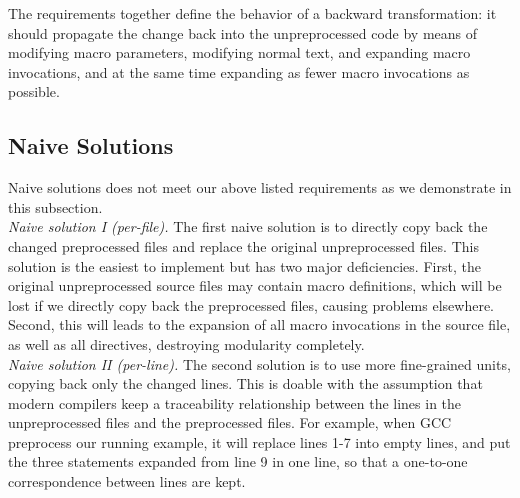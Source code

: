 The requirements together define the behavior of a backward
transformation: it should propagate the change
back into the unpreprocessed code by means of modifying macro parameters,
modifying normal text, and expanding macro invocations, and at the same time expanding as
fewer macro invocations as possible. 

\subsection{Naive Solutions}\label{sec:naive}
Naive solutions does not meet our above listed requirements as we demonstrate in this subsection. \\

\noindent\emph{Naive solution I (per-file).}
The first naive solution is to directly copy back the changed
preprocessed files
and replace the original unpreprocessed files. This solution is the easiest to
implement but has two major deficiencies. First, the original unpreprocessed source files may contain
macro definitions, which will be lost if we directly
copy back the preprocessed files, causing problems elsewhere. Second, this will leads to the expansion
of all macro invocations in the source file, as well as all 
directives, destroying modularity completely.\\

\noindent\emph{Naive solution II (per-line).}
The second solution is to use more fine-grained units, copying back
only the changed lines. This is doable with the assumption that modern
compilers keep a traceability relationship between the lines
in the unpreprocessed files and the preprocessed files. For example,
when GCC preprocess our running example, it will replace lines 1-7 into
empty lines, and put the three statements expanded from line 9 in one
line, so that a one-to-one correspondence between lines are kept. 

